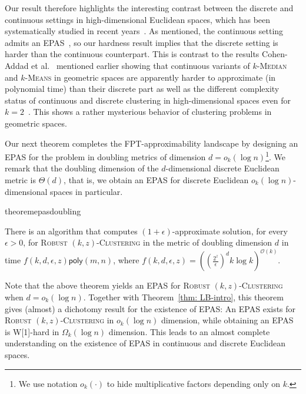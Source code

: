 \documentclass[11pt]{article}
\newcommand{\poly}{\ensuremath{\textsf{poly}}}
\newcommand{\km}{\textsc{$k$-Median}\xspace}
\newcommand{\kmns}{\textsc{$k$-Means}\xspace}
\newcommand{\fpt}{\textsf{FPT}\xspace}
\newcommand{\rkc}{\textsc{Robust $(k,z)$-Clustering}\xspace}
\newcommand{\bigO}[1]{\ensuremath{\mathcal{O}\left(#1\right)}}
\begin{document}
Our result therefore highlights the interesting contrast between the discrete and continuous settings in high-dimensional Euclidean spaces, which has been systematically studied in recent years~\cite{cohen2022johnson,cohen2019inapproximability,cohen2021approximability}.
As mentioned, the continuous setting admits an EPAS~\cite{abbasi-etal23:epas-norm-clustering}, so  our hardness result  implies that the discrete setting is harder than the continuous counterpart. 
This is contrast to the results Cohen-Addad et al.~\cite{cohen2021approximability} mentioned earlier showing that continuous variants of \km and \kmns in geometric spaces  are apparently harder to approximate (in polynomial time) than their discrete part as well as the different complexity status of continuous and discrete clustering in high-dimensional spaces even for $k=2$~\cite{drineas-etal04:np-hardness-2-means-highdim}. This shows a rather mysterious behavior of clustering problems in geometric spaces. 


Our next theorem completes the \fpt-approximability landscape by designing an EPAS for the problem in doubling metrics of dimension $d = o_k(\log n)$\footnote{We use notation $o_k(\cdot)$ to hide multiplicative factors depending only on $k$.}. We remark that the doubling dimension of the $d$-dimensional discrete Euclidean metric is $\Theta(d)$, that is, we obtain an EPAS for discrete Euclidean $o_k(\log n)$-dimensional spaces in particular.


\begin{restatable} {theorem}{epasdoubling}\label{thm:pas_kd}

There is an algorithm that computes $(1+\epsilon)$-approximate solution, for every $\epsilon>0$,  for \rkc in the metric of doubling dimension $d$ in time $f(k,d,\epsilon,z) \poly(m,n)$, where $f(k,d,\epsilon,z) = \left(\left(\frac{2^z}{\epsilon}\right)^d k \log k\right)^{\bigO{k}}$.

\end{restatable} 



Note that the above theorem yields an EPAS for \rkc when $d=o_k(\log n)$.
Together with Theorem~\ref{thm: LB-intro}, this theorem gives (almost) a dichotomy result for the existence of EPAS: An EPAS exists for \rkc in $o_k(\log n)$ dimension, while obtaining an EPAS is W[1]-hard in $\Omega_k(\log n)$ dimension. This leads to an almost complete understanding on the existence of EPAS in continuous and discrete Euclidean spaces. 
\end{document}
